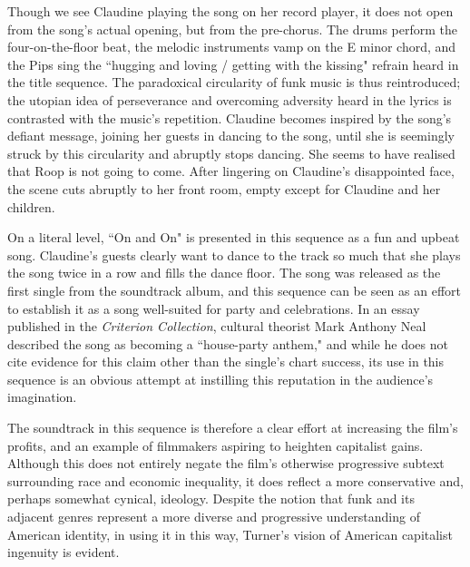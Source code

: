 Though we see Claudine playing the song on her record player, it does not open from the song's actual opening, but from the pre-chorus.
The drums perform the four-on-the-floor beat, the melodic instruments vamp on the E minor chord, and the Pips sing the ``hugging and loving / getting with the kissing" refrain heard in the title sequence.
The paradoxical circularity of funk music is thus reintroduced; the utopian idea of perseverance and overcoming adversity heard in the lyrics is contrasted with the music's repetition.
Claudine becomes inspired by the song's defiant message, joining her guests in dancing to the song, until she is seemingly struck by this circularity and abruptly stops dancing.
She seems to have realised that Roop is not going to come.
After lingering on Claudine's disappointed face, the scene cuts abruptly to her front room, empty except for Claudine and her children.

On a literal level, ``On and On" is presented in this sequence as a fun and upbeat song.
Claudine's guests clearly want to dance to the track so much that she plays the song twice in a row and fills the dance floor.
The song was released as the first single from the soundtrack album, and this sequence can be seen as an effort to establish it as a song well-suited for party and celebrations.
In an essay published in the \textit{Criterion Collection}, cultural theorist Mark Anthony Neal described the song as becoming a ``house-party anthem," and while he does not cite evidence for this claim other than the single's chart success, its use in this sequence is an obvious attempt at instilling this reputation in the audience's imagination.

The soundtrack in this sequence is therefore a clear effort at increasing the film's profits, and an example of filmmakers aspiring to heighten capitalist gains.
Although this does not entirely negate the film's otherwise progressive subtext surrounding race and economic inequality, it does reflect a more conservative and, perhaps somewhat cynical, ideology.
Despite the notion that funk and its adjacent genres represent a more diverse and progressive understanding of American identity, in using it in this way, Turner's vision of American capitalist ingenuity is evident.

